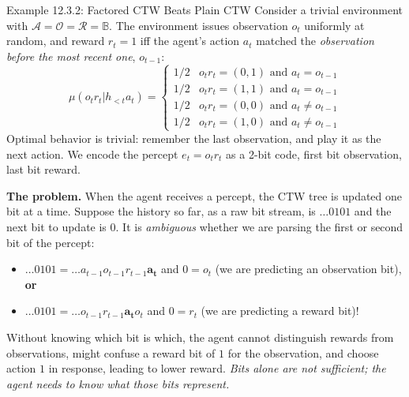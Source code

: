 \documentclass[aspectratio=169,10pt]{beamer}
\newcommand{\BB}{\mathbb{B}}
\newcommand{\Acal}{\mathcal{A}}
\newcommand{\Ocal}{\mathcal{O}}
\newcommand{\Rcal}{\mathcal{R}}
\begin{document}
\begin{frame}{Example 12.3.2: Factored CTW Beats Plain CTW}
Consider a trivial environment with $\Acal=\Ocal=\Rcal=\BB$. The environment issues
observation $o_t$ uniformly at random, and reward $r_t=1$ iff the agent's action $a_t$
matched the \emph{observation before the most recent one}, $o_{t-1}$:
$$\mu(o_tr_t|h_{<t}a_t)=\begin{cases}
1/2 & o_tr_t=(0,1)\text{ and } a_t=o_{t-1}\\
1/2 & o_tr_t=(1,1)\text{ and } a_t=o_{t-1}\\
1/2 & o_tr_t=(0,0)\text{ and } a_t\ne o_{t-1}\\
1/2 & o_tr_t=(1,0)\text{ and } a_t\ne o_{t-1}
\end{cases}$$
Optimal behavior is trivial: remember the last observation, and play it as the next
action. We encode the percept $e_t=o_tr_t$ as a 2-bit code, first bit observation, last
bit reward.

\textbf{The problem.} When the agent receives a percept, the CTW tree is updated one bit
at a time. Suppose the history so far, as a raw bit stream, is $\ldots 0101$ and the next
bit to update is $0$. It is \emph{ambiguous} whether we are parsing the first or second
bit of the percept:
\begin{itemize}
\item $\ldots 0101 = \ldots a_{t-1}o_{t-1}r_{t-1}\mathbf{a_t}$ and $0=o_t$ (we are
predicting an observation bit), \textbf{or}
\item $\ldots 0101 = \ldots o_{t-1}r_{t-1}\mathbf{a_t}o_t$ and $0=r_t$ (we are predicting
a reward bit)!
\end{itemize}
Without knowing which bit is which, the agent cannot distinguish rewards from
observations, might confuse a reward bit of $1$ for the observation, and choose action
$1$ in response, leading to lower reward. \emph{Bits alone are not sufficient; the agent
needs to know what those bits represent.}
\end{frame}
\end{document}
